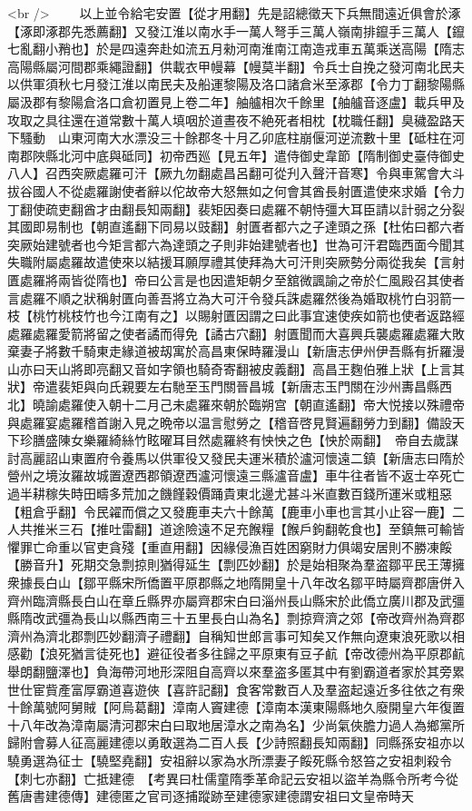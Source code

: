 <br />
　　以上並令給宅安置【從才用翻】先是詔總徵天下兵無間遠近俱會於涿【涿即涿郡先悉薦翻】又發江淮以南水手一萬人弩手三萬人嶺南排鑹手三萬人【鑹七亂翻小矟也】於是四遠奔赴如流五月勑河南淮南江南造戎車五萬乘送高陽【隋志高陽縣屬河間郡乘繩證翻】供載衣甲幔幕【幔莫半翻】令兵士自挽之發河南北民夫以供軍須秋七月發江淮以南民夫及船運黎陽及洛口諸倉米至涿郡【令力丁翻黎陽縣屬汲郡有黎陽倉洛口倉初置見上卷二年】舳艫相次千餘里【舳艫音逐盧】載兵甲及攻取之具往還在道常數十萬人填咽於道晝夜不絶死者相枕【枕職任翻】臭穢盈路天下騷動　山東河南大水漂没三十餘郡冬十月乙卯底柱崩偃河逆流數十里【砥柱在河南郡陜縣北河中底與砥同】初帝西廵【見五年】遣侍御史韋節【隋制御史臺侍御史八人】召西突厥處羅可汗【厥九勿翻處昌呂翻可從刋入聲汗音寒】令與車駕會大斗拔谷國人不從處羅謝使者辭以佗故帝大怒無如之何會其酋長射匱遣使來求婚【令力丁翻使疏吏翻酋才由翻長知兩翻】裴矩因奏曰處羅不朝恃彊大耳臣請以計弱之分裂其國即易制也【朝直遙翻下同易以豉翻】射匱者都六之子達頭之孫【杜佑曰都六者突厥始建號者也今矩言都六為達頭之子則非始建號者也】世為可汗君臨西面今聞其失職附屬處羅故遣使來以結援耳願厚禮其使拜為大可汗則突厥勢分兩從我矣【言射匱處羅將兩皆從隋也】帝曰公言是也因遣矩朝夕至舘微諷諭之帝於仁風殿召其使者言處羅不順之狀稱射匱向善吾將立為大可汗令發兵誅處羅然後為婚取桃竹白羽箭一枝【桃竹桃枝竹也今江南有之】以賜射匱因謂之曰此事宜速使疾如箭也使者返路經處羅處羅愛箭將留之使者譎而得免【譎古穴翻】射匱聞而大喜興兵襲處羅處羅大敗棄妻子將數千騎東走緣道被刼寓於高昌東保時羅漫山【新唐志伊州伊吾縣有折羅漫山亦曰天山將即亮翻又音如字領也騎奇寄翻被皮義翻】高昌王麴伯雅上狀【上言其狀】帝遣裴矩與向氏親要左右馳至玉門關晉昌城【新唐志玉門關在沙州夀昌縣西北】曉諭處羅使入朝十二月己未處羅來朝於臨朔宫【朝直遙翻】帝大悦接以殊禮帝與處羅宴處羅稽首謝入見之晩帝以温言慰勞之【稽音啓見賢遍翻勞力到翻】備設天下珍膳盛陳女樂羅綺絲竹眩曜耳目然處羅終有怏怏之色【怏於兩翻】　帝自去歲謀討高麗詔山東置府令養馬以供軍役又發民夫運米積於瀘河懷遠二鎮【新唐志曰隋於營州之境汝羅故城置遼西郡領遼西瀘河懷遠三縣瀘音盧】車牛往者皆不返士卒死亡過半耕稼失時田疇多荒加之饑饉穀價踊貴東北邊尤甚斗米直數百錢所運米或粗惡【粗倉乎翻】令民糴而償之又發鹿車夫六十餘萬【鹿車小車也言其小止容一鹿】二人共推米三石【推吐雷翻】道途險遠不足充餱糧【餱戶鉤翻乾食也】至鎮無可輸皆懼罪亡命重以官吏貪殘【重直用翻】因緣侵漁百姓困窮財力俱竭安居則不勝凍餒【勝音升】死期交急剽掠則猶得延生【剽匹妙翻】於是始相聚為羣盗鄒平民王薄擁衆據長白山【鄒平縣宋所僑置平原郡縣之地隋開皇十八年改名鄒平時屬齊郡唐併入齊州臨濟縣長白山在章丘縣界亦屬齊郡宋白曰淄州長山縣宋於此僑立廣川郡及武彊縣隋改武彊為長山以縣西南三十五里長白山為名】剽掠齊濟之郊【帝改齊州為齊郡濟州為濟北郡剽匹妙翻濟子禮翻】自稱知世郎言事可知矣又作無向遼東浪死歌以相感勸【浪死猶言徒死也】避征役者多往歸之平原東有豆子䴚【帝改德州為平原郡䴚舉朗翻鹽澤也】負海帶河地形深阻自高齊以來羣盗多匿其中有劉霸道者家於其旁累世仕宦貲產富厚霸道喜遊俠【喜許記翻】食客常數百人及羣盗起遠近多往依之有衆十餘萬號阿舅賊【阿烏葛翻】漳南人竇建德【漳南本漢東陽縣地久廢開皇六年復置十八年改為漳南屬清河郡宋白曰取地居漳水之南為名】少尚氣俠膽力過人為鄉黨所歸附會募人征高麗建德以勇敢選為二百人長【少詩照翻長知兩翻】同縣孫安祖亦以驍勇選為征士【驍堅堯翻】安祖辭以家為水所漂妻子餒死縣令怒笞之安祖刺殺令【刺七亦翻】亡抵建德　【考異曰杜儒童隋季革命記云安祖以盜羊為縣令所考今從舊唐書建德傳】建德匿之官司逐捕蹤跡至建德家建德謂安祖曰文皇帝時天